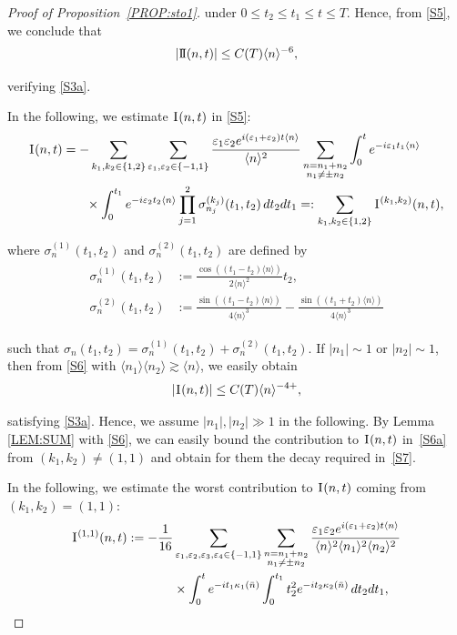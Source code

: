 \documentclass[%
11pt,  reqno]{amsart}
\newcommand{\1}{\hspace{0.2mm}\text{I}\hspace{0.2mm}}
\newcommand{\II}{\text{I \hspace{-2.8mm} I} }
\newcommand{\noi}{\noindent}
\newcommand{\eps}{\varepsilon}
\newcommand{\kk}{\kappa}
\newcommand{\s}{\sigma}
\newcommand{\ges}{\gtrsim}
\newcommand{\jb}[1]
{\langle #1 \rangle}
\numberwithin{equation}{section}
\numberwithin{theorem}{section}
\begin{document}
\begin{proof}[Proof of Proposition~\ref{PROP:sto1}]
\noi
under $0 \le t_2 \le t_1 \leq t \leq T$.
Hence, from \eqref{S5},  we conclude that 
\[ |\II(n, t)|\le C(T) \jb{n}^{-6},\]

\noi
verifying \eqref{S3a}.


In the following, we estimate $\1(n, t)$ in \eqref{S5}:
\begin{align}
\begin{split}
\1 (n, t) & = 
 - \sum_{k_1, k_2 \in \{1, 2\}} \sum_{\eps_1, \eps_2 \in \{-1, 1\}}
\frac{\eps_1\eps_2e^{i (\eps_1+\eps_2) t\jb{n}}}{\jb{n}^2}
\sum_{\substack{n = n_1 + n_2\\n_1 \ne \pm n_2}}
\int_0^{t} 
e^{-i \eps_1t_1\jb{n}} \\ 
& \hphantom{XX}
\times  \int_0^{t_1} e^{-i \eps_2t_2\jb{n}}
\prod_{j = 1}^2\s_{n_j}^{(k_j)}(t_1, t_2)
\,   dt_2dt_1 =: \sum_{k_1, k_2 \in \{1, 2\}} \1^{(k_1,k_2)} (n, t),
\end{split}
\label{S6a}
\end{align}

\noi
where 
$\s_{n}^{(1)}(t_1, t_2)$
and $\s_{n}^{(2)}(t_1, t_2)$ are defined by 
\begin{align}
\begin{split}
\s_{n}^{(1)}(t_1, t_2) &  :=  
 \frac{\cos((t_1 - t_2)\jb{n}) }{2 \jb{n}^2} t_2, 
\\ 
\s_{n}^{(2)}(t_1, t_2)  & := 
  \frac{\sin ((t_1-t_2)  \jb{n})}{4\jb{n}^3 }
-  \frac{\sin ((t_1 +  t_2) \jb{n})}{4\jb{n}^3 }
\end{split}
\label{S6}
\end{align}


\noi
such that 
$ \s_{n}(t_1, t_2) =  \s_{n}^{(1)}(t_1, t_2) + \s_{n}^{(2)}(t_1, t_2)$.
If $|n_1| \sim 1$ or $|n_2| \sim1$, then 
 from \eqref{S6}
 with $\jb{n_1} \jb{n_2} \ges \jb{n}$, we easily obtain 
\begin{align}
|\1 (n, t)| \le C(T) \jb{n}^{-4+},
\label{S7}
\end{align}

\noi
satisfying \eqref{S3a}.
Hence, 
we assume  $|n_1|, |n_2|\gg 1$
in the following.
 By Lemma \ref{LEM:SUM}
 with \eqref{S6}, 
we can easily bound 
the contribution to $\1(n, t)$ in~\eqref{S6a}
from  $(k_1, k_2) \ne (1, 1)$
and obtain for them the decay required in~\eqref{S7}.

In  the following, we  estimate the worst contribution to $\1(n, t)$ coming from 
 $(k_1, k_2) = (1, 1)$:
\begin{align*}
\begin{split}
\1^{(1,1)} (n, t)
& : = -\frac{1}{16} \sum_{\eps_1, \eps_2, \eps_3, \eps_4 \in \{-1, 1\}}
\sum_{\substack{n = n_1 + n_2\\n_1 \ne \pm n_2}} %
\frac{\eps_1\eps_2e^{i (\eps_1+\eps_2) t\jb{n}}}{\jb{n}^2\jb{n_1}^2 \jb{n_2}^2}\\
& \hphantom{XXXX}\times
\int_0^{t} 
e^{-i t_1 \kk_1( \bar n)}
 \int_0^{t_1} 
t_2^2   e^{-i t_2\kk_2(\bar n)}
 \, dt_2dt_1, 
\end{split}
\end{align*}



\end{proof}
\end{document}
